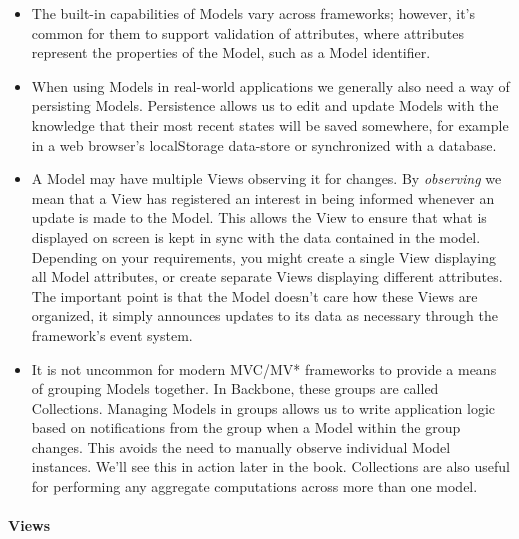 \documentclass[9pt]{book}
\begin{document}
\begin{itemize}
\item
  The built-in capabilities of Models vary across frameworks; however,
  it's common for them to support validation of attributes, where
  attributes represent the properties of the Model, such as a Model
  identifier.
\item
  When using Models in real-world applications we generally also need a
  way of persisting Models. Persistence allows us to edit and update
  Models with the knowledge that their most recent states will be saved
  somewhere, for example in a web browser's localStorage data-store or
  synchronized with a database.
\item
  A Model may have multiple Views observing it for changes. By
  \emph{observing} we mean that a View has registered an interest in
  being informed whenever an update is made to the Model. This allows
  the View to ensure that what is displayed on screen is kept in sync
  with the data contained in the model. Depending on your requirements,
  you might create a single View displaying all Model attributes, or
  create separate Views displaying different attributes. The important
  point is that the Model doesn't care how these Views are organized, it
  simply announces updates to its data as necessary through the
  framework's event system.
\item
  It is not uncommon for modern MVC/MV* frameworks to provide a means of
  grouping Models together. In Backbone, these groups are called
  Collections. Managing Models in groups allows us to write application
  logic based on notifications from the group when a Model within the
  group changes. This avoids the need to manually observe individual
  Model instances. We'll see this in action later in the book.
  Collections are also useful for performing any aggregate computations
  across more than one model.
\end{itemize}

\paragraph{Views}\label{views}
\end{document}
